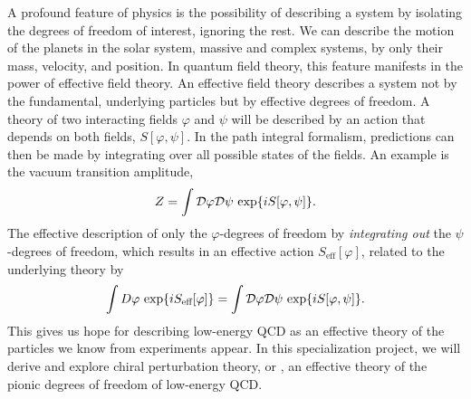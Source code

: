A profound feature of physics is the possibility of describing a system by isolating the degrees of freedom of interest, ignoring the rest.
We can describe the motion of the planets in the solar system, massive and complex systems, by only their mass, velocity, and position.
In quantum field theory, this feature manifests in the power of effective field theory.
An effective field theory describes a system not by the fundamental, underlying particles but by effective degrees of freedom.
A theory of two interacting fields $\varphi$ and $\psi$ will be described by an action that depends on both fields, $S[\varphi, \psi]$.
In the path integral formalism, predictions can then be made by integrating over all possible states of the fields.
An example is the vacuum transition amplitude,
\begin{equation}
    Z = \int \mathcal{D} \varphi \mathcal{D} \psi \, \exp{i S[\varphi, \psi]}.
\end{equation}
The effective description of only the $\varphi$-degrees of freedom by \emph{integrating out} the $\psi$-degrees of freedom, which results in an effective action $S_\text{eff}[\varphi]$, related to the underlying theory by~\cite{Schwartz:QFT}
\begin{equation}
    \label{integrating out degrees of freedom}
    \int D \varphi \, \exp{i S_\text{eff}[\varphi]} 
    =
    \int \mathcal{D} \varphi \mathcal{D} \psi \, \exp{i S[\varphi, \psi]}.
\end{equation}
This gives us hope for describing low-energy QCD as an effective theory of the particles we know from experiments appear.
In this specialization project, we will derive and explore chiral perturbation theory, or \chpt, an effective theory of the pionic degrees of freedom of low-energy QCD.

